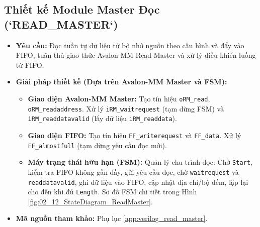 \subsection{Thiết kế Module Master Đọc (`READ\_MASTER`)}
\begin{itemize}
    \item \textbf{Yêu cầu:} Đọc tuần tự dữ liệu từ bộ nhớ nguồn theo cấu hình và đẩy vào FIFO, tuân thủ giao thức Avalon-MM Read Master và xử lý điều khiển luồng từ FIFO.
    \item \textbf{Giải pháp thiết kế (Dựa trên Avalon-MM Master và FSM):}
        \begin{itemize}
            \item \textbf{Giao diện Avalon-MM Master:} Tạo tín hiệu \texttt{oRM\_read}, \texttt{oRM\_readaddress}. Xử lý \texttt{iRM\_waitrequest} (tạm dừng FSM) và \texttt{iRM\_readdatavalid} (lấy dữ liệu \texttt{iRM\_readdata}).
            \item \textbf{Giao diện FIFO:} Tạo tín hiệu \texttt{FF\_writerequest} và \texttt{FF\_data}. Xử lý \texttt{FF\_almostfull} (tạm dừng yêu cầu đọc mới).
            \item \textbf{Máy trạng thái hữu hạn (FSM):} Quản lý chu trình đọc: Chờ \texttt{Start}, kiểm tra FIFO không gần đầy, gửi yêu cầu đọc, chờ \texttt{waitrequest} và \texttt{readdatavalid}, ghi dữ liệu vào FIFO, cập nhật địa chỉ/bộ đếm, lặp lại cho đến khi đủ \texttt{Length}. Sơ đồ FSM chi tiết trong Hình \ref{fig:02_12_StateDiagram_ReadMaster}.
        \end{itemize}
    \item \textbf{Mã nguồn tham khảo:} Phụ lục \ref{app:verilog_read_master}.
\end{itemize}


